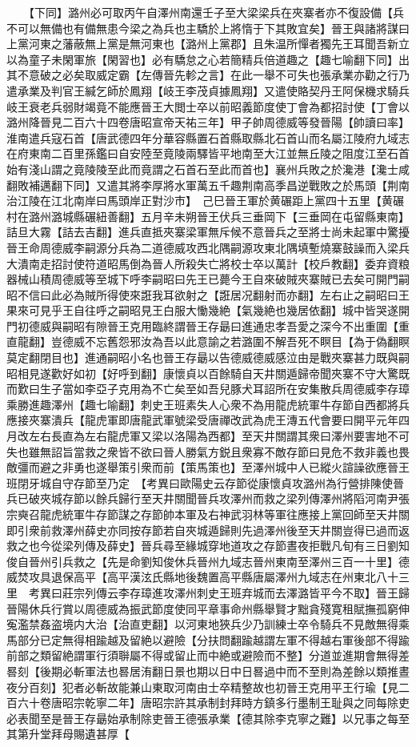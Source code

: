 　　【下同】潞州必可取丙午自澤州南還壬子至大梁梁兵在夾寨者亦不復設備【兵不可以無備也有備無患今梁之為兵也主驕於上將惰于下其敗宜矣】晉王與諸將謀曰上黨河東之藩蔽無上黨是無河東也【潞州上黨郡】且朱温所憚者獨先王耳聞吾新立以為童子未閑軍旅【閑習也】必有驕怠之心若簡精兵倍道趣之【趣七喻翻下同】出其不意破之必矣取威定霸【左傳晉先軫之言】在此一舉不可失也張承業亦勸之行乃遣承業及判官王緘乞師於鳳翔【岐王李茂貞據鳳翔】又遣使賂契丹王阿保機求騎兵岐王衰老兵弱財竭竟不能應晉王大閲士卒以前昭義節度使丁會為都招討使【丁會以潞州降晉見二百六十四卷唐昭宣帝天祐三年】甲子帥周德威等發晉陽【帥讀曰率】　淮南遣兵寇石首【唐武德四年分華容縣置石首縣取縣北石首山而名屬江陵府九域志在府東南二百里孫鑑曰自安陸至竟陵兩驛皆平地南至大江並無丘陵之阻度江至石首始有淺山謂之竟陵陵至此而竟謂之石首石至此而首也】襄州兵敗之於瀺港【瀺士咸翻敗補邁翻下同】又遣其將李厚將水軍萬五千趣荆南高季昌逆戰敗之於馬頭【荆南治江陵在江北南岸曰馬頭岸正對沙市】　己巳晉王軍於黄碾距上黨四十五里【黄碾村在潞州潞城縣碾紐善翻】五月辛未朔晉王伏兵三垂岡下【三垂岡在屯留縣東南】詰旦大霧【詰去吉翻】進兵直抵夾寨梁軍無斥候不意晉兵之至將士尚未起軍中驚擾晉王命周德威李嗣源分兵為二道德威攻西北隅嗣源攻東北隅填塹燒寨鼓譟而入梁兵大潰南走招討使符道昭馬倒為晉人所殺失亡將校士卒以萬計【校戶教翻】委弃資粮器械山積周德威等至城下呼李嗣昭曰先王已薨今王自來破賊夾寨賊已去矣可開門嗣昭不信曰此必為賊所得使來誑我耳欲射之【誑居况翻射而亦翻】左右止之嗣昭曰王果來可見乎王自往呼之嗣昭見王白服大慟幾絶【氣幾絶也幾居依翻】城中皆哭遂開門初德威與嗣昭有隙晉王克用臨終謂晉王存朂曰進通忠孝吾愛之深今不出重圍【重直龍翻】豈德威不忘舊怨邪汝為吾以此意諭之若潞圍不解吾死不瞑目【為于偽翻瞑莫定翻閉目也】進通嗣昭小名也晉王存朂以告德威德威感泣由是戰夾寨甚力既與嗣昭相見遂歡好如初【好呼到翻】康懷貞以百餘騎自天井關遁歸帝聞夾寨不守大驚既而歎曰生子當如李亞子克用為不亡矣至如吾兒豚犬耳詔所在安集散兵周德威李存璋乘勝進趣澤州【趣七喻翻】刺史王班素失人心衆不為用龍虎統軍牛存節自西都將兵應接夾寨潰兵【龍虎軍即唐龍武軍號梁受唐禪改武為虎王漙五代會要曰開平元年四月改左右長直為左右龍虎軍又梁以洛陽為西都】至天井關謂其衆曰澤州要害地不可失也雖無詔旨當救之衆皆不欲曰晉人勝氣方鋭且衆寡不敵存節曰見危不救非義也畏敵彊而避之非勇也遂舉策引衆而前【策馬策也】至澤州城中人已縱火諠譟欲應晉王班閉牙城自守存節至乃定　【考異曰歐陽史云存節從康懷貞攻潞州為行營排陳使晉兵已破夾城存節以餘兵歸行至天井關聞晉兵攻澤州而救之梁列傳澤州將䧟河南尹張宗奭召龍虎統軍牛存節謀之存節帥本軍及右神武羽林等軍往應接上黨回師至天井關即引衆前救澤州薛史亦同按存節若自夾城遁歸則先過澤州後至天井關豈得已過而返救之也今從梁列傳及薛史】晉兵尋至緣城穿地道攻之存節晝夜拒戰凡旬有三日劉知俊自晉州引兵救之【先是命劉知俊休兵晉州九域志晉州東南至澤州三百一十里】德威焚攻具退保高平【高平漢泫氏縣地後魏置高平縣唐屬澤州九域志在州東北八十三里　考異曰莊宗列傳云李存璋進攻澤州刺史王班弃城而去澤潞皆平今不取】晉王歸晉陽休兵行賞以周德威為振武節度使同平章事命州縣舉賢才黜貪殘寛租賦撫孤窮伸寃濫禁姦盗境内大治【治直吏翻】以河東地狹兵少乃訓練士卒令騎兵不見敵無得乘馬部分已定無得相踰越及留絶以避險【分扶問翻踰越謂左軍不得越右軍後部不得踰前部之類留絶謂軍行須聨屬不得或留止而中絶或避險而不整】分道並進期會無得差晷刻【後期必斬軍法也晷居洧翻日景也期以日中日晷過中而不至則為差餘以類推晝夜分百刻】犯者必斬故能兼山東取河南由士卒精整故也初晉王克用平王行瑜【見二百六十卷唐昭宗乾寧二年】唐昭宗許其承制封拜時方鎮多行墨制王耻與之同每除吏必表聞至是晉王存朂始承制除吏晉王德張承業【德其除李克寧之難】以兄事之每至其第升堂拜母賜遺甚厚【
